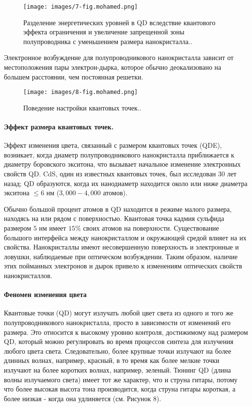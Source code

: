 \documentclass[a4paper,14pt]{extarticle}
\begin{document}
\begin{figure}[htbp]
    \centering
    \texttt{[image: images/7-fig.mohamed.png]}
    \caption{\label{fig:mohamed} Разделение энергетических уровней в QD вследствие квантового эффекта ограничения и увеличение запрещенной зоны полупроводника с уменьшением размера нанокристалла.\cite{mohamed}.}
\end{figure}

Электронное возбуждение для полупроводникового нанокристалла зависит от местоположения пары электрон-дырка, которое обычно деокализовано на большем расстоянии, чем постоянная решетки.

\begin{figure}[htbp]
    \centering
    \texttt{[image: images/8-fig.mohamed.png]}
    \caption{\label{fig:mohamed1} Поведение настройки квантовых точек.\cite{mohamed}.}
\end{figure}

\paragraph{Эффект размера квантовых точек.}

Эффект изменения цвета, связанный с размером квантовых точек (QDE), возникает, когда диаметр полупроводникового нанокристалла приближается к диаметру боровского экситона, что вызывает начальное изменение электронных свойств QD. CdS, один из известных квантовых точек, был исследован 30 лет назад; QD образуются, когда их нанодиаметр находится около или ниже диаметра экситона \( \leq 6 \) нм (\(3,000-4,000\) атомов).

Обычно большой процент атомов в QD находится в режиме малого размера, находясь на или рядом с поверхностью. Квантовая точка кадмия сульфида размером $5$ нм имеет $15\%$ своих атомов на поверхности. Существование большого интерфейса между нанокристаллом и окружающей средой влияет на их свойства. Нанокристаллы имеют несовершенную поверхность и электронные и ловушки, наблюдаемые при оптическом возбуждении. Таким образом, наличие этих пойманных электронов и дырок привело к изменениям оптических свойств нанокристаллов.

\paragraph{Феномен изменения цвета}

Квантовые точки (QD) могут излучать любой цвет света из одного и того же полупроводникового нанокристалла, просто в зависимости от изменений его размера. Это относится к высокому уровню контроля, достижимому над размером QD, который можно регулировать во время процессов синтеза для излучения любого цвета света. Следовательно, более крупные точки излучают на более длинных волнах, например, красный, в то время как более мелкие точки излучают на более коротких волнах, например, зеленый. Тюнинг QD (длина волны излучаемого света) имеет тот же характер, что и струна гитары, потому что более высокая высота тона производится, когда струна гитары короткая, а более низкая - когда она удлиняется (см. Рисунок 8).
\end{document}
